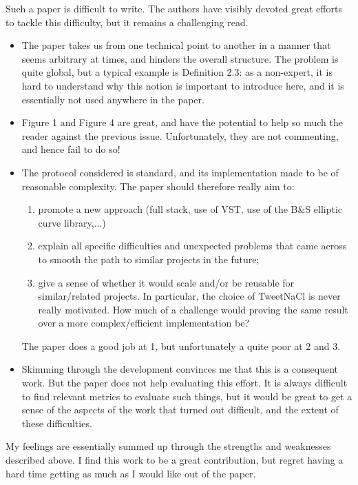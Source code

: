 Such a paper is difficult to write. The authors have visibly devoted great efforts to tackle this difficulty, but it remains a challenging read.
\begin{itemize}
    \item The paper takes us from one technical point to another in a manner that seems arbitrary at times, and hinders the overall structure. The problem is quite global, but a typical example is Definition 2.3: as a non-expert, it is hard to understand why this notion is important to introduce here, and it is essentially not used anywhere in the paper.
    \item Figure 1 and Figure 4 are great, and have the potential to help so much the reader against the previous issue. Unfortunately, they are not commenting, and hence fail to do so!
    \item The protocol considered is standard, and its implementation made to be of reasonable complexity. The paper should therefore really aim to:
          \begin{enumerate}
              \item promote a new approach (full stack, use of VST, use of the B\&S elliptic curve library,...)
              \item explain all specific difficulties and unexpected problems that came across to smooth the path to similar projects in the future;
              \item give a sense of whether it would scale and/or be reusable for similar/related projects. In particular, the choice of TweetNaCl is never really motivated. How much of a challenge would proving the same result over a more complex/efficient implementation be?
          \end{enumerate}

          The paper does a good job at 1, but unfortunately a quite poor at 2 and 3.
    \item Skimming through the development convinces me that this is a consequent work. But the paper does not help evaluating this effort. It is always difficult to find relevant metrics to evaluate such things, but it would be great to get a sense of the aspects of the work that turned out difficult, and the extent of these difficulties.
\end{itemize}

\begin{center}
\end{center}
My feelings are essentially summed up through the strengths and weaknesses described above. I find this work to be a great contribution, but regret having a hard time getting as much as I would like out of the paper.

